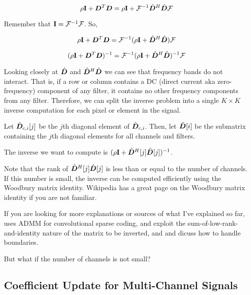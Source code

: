 \documentclass{article}
\begin{document}
\begin{equation}
\rho{\bf I} + \bm{D}^T\bm{D} = \rho{\bf I} + \mathcal{F}^{-1}\hat{\bm{D}}^H\hat{\bm{D}}\mathcal{F}
\end{equation}

Remember that ${\bf I} = \mathcal{F}^{-1}\mathcal{F}$. So,

\begin{equation}
\rho{\bf I} + \bm{D}^T\bm{D} = \mathcal{F}^{-1}(\rho{\bf I} + \hat{\bm{D}}^H\hat{\bm{D}})\mathcal{F}
\end{equation}

\begin{equation}
(\rho{\bf I} + \bm{D}^T\bm{D})^{-1} = \mathcal{F}^{-1}(\rho{\bf I} + \hat{\bm{D}}^H\hat{\bm{D}})^{-1}\mathcal{F}
\end{equation}

Looking closely at $\hat{\bm{D}}$ and $\hat{\bm{D}}^H\hat{\bm{D}}$ we can see that frequency bands do not interact. That is, if a row or column contains a DC (direct current aka zero-frequency) component of any filter, it contains no other frequency components from any filter. Therefore, we can split the inverse problem into a single $K \times K$ inverse computation for each pixel or element in the signal.

Let $\hat{\bm{D}}_{c,i}[j]$ be the $j$th diagonal element of $\hat{\bm{D}}_{c,i}$. Then, let $\hat{\bm{D}}[i]$ be the submatrix containing the $j$th diagonal elements for all channels and filters.

The inverse we want to compute is $(\rho{\bf I} + \hat{\bm{D}}^H[j]\hat{\bm{D}}[j])^{-1}$.

Note that the rank of $\hat{\bm{D}}^H[j]\hat{\bm{D}}[j]$ is less than or equal to the number of channels. If this number is small, the inverse can be computed efficiently using the Woodbury matrix identity. Wikipedia has a great page on the Woodbury matrix identity if you are not familiar.

If you are looking for more explanations or sources of what I've explained so far, \cite{bristow2013fast} uses ADMM for convolutional sparse coding, \cite{heide2015fast} and \cite{vsorel2016fast} exploit the sum-of-low-rank-and-identity nature of the matrix to be inverted, and \cite{wohlberg2016boundary} and \cite{heide2015fast} dicuss how to handle boundaries.

But what if the number of channels is not small?

\subsection{Coefficient Update for Multi-Channel Signals}
\end{document}
